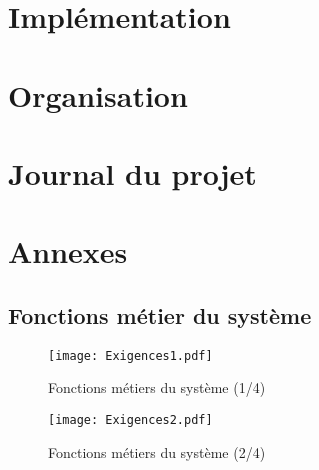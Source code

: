 \documentclass[12pt,fleqn]{book} %
\begin{document}
\part{Implémentation}

%
% 


%
%

\part{Organisation}


\part{Journal du projet}



\appendix
\part{Annexes}
\chapter{Fonctions métier du système}

\begin{figure}[h!]
\centering\texttt{[image: Exigences1.pdf]}
\caption{\label{fig:exi1} Fonctions métiers du système (1/4)}
\end{figure}

\begin{figure}[h!]
\centering\texttt{[image: Exigences2.pdf]}
\caption{\label{fig:exi2} Fonctions métiers du système (2/4)}
\end{figure}
\end{document}
